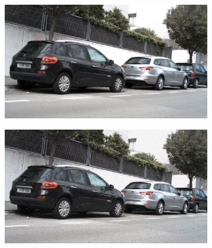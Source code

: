 \documentclass[a4paper]{ctexart}
\begin{document}
\begin{figure}[htbp]
\begin{subfigure}{0.08\textwidth}
			\label{fig：Gamma=0.6, Gauss Noise = 1.0}
		\end{subfigure} \\
		
		\vspace{-15pt}
		
		\begin{subfigure}{0.02\textwidth}
			\captionsetup{font=scriptsize}
			\caption*{}
			\vspace{-2pt}
		\end{subfigure}
		\begin{subfigure}{0.08\textwidth}
			\captionsetup{font=scriptsize}
			\includegraphics[width=\linewidth]{picture/Edge Detection/degrade/RGB_001 Gamma=0.7, Gauss Noise=0.0}
			\label{fig: Gamma=0.7, Gauss Noise = 0.0}
		\end{subfigure}
		\begin{subfigure}{0.08\textwidth}
			\captionsetup{font=scriptsize}
			\includegraphics[width=\linewidth]{picture/Edge Detection/degrade/RGB_001 Gamma=0.7, Gauss Noise=0.1}

\end{subfigure}
\end{figure}
\end{document}

